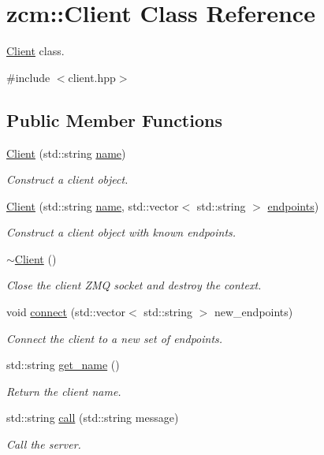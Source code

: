 \hypertarget{classzcm_1_1Client}{}\section{zcm\+:\+:Client Class Reference}
\label{classzcm_1_1Client}


\hyperlink{classzcm_1_1Client}{Client} class.  




{\ttfamily \#include $<$client.\+hpp$>$}

\subsection*{Public Member Functions}
\begin{DoxyCompactItemize}
\item 
\hyperlink{classzcm_1_1Client_a5da343b18178f50c0ab24b852af7f349}{Client} (std\+::string \hyperlink{classzcm_1_1Client_ae972b951134774fd2246d802e2bc6fc0}{name})
\begin{DoxyCompactList}\small\item\em Construct a client object. \end{DoxyCompactList}\item 
\hyperlink{classzcm_1_1Client_a070dd5b851fe5f5c0a679bcb23d085b3}{Client} (std\+::string \hyperlink{classzcm_1_1Client_ae972b951134774fd2246d802e2bc6fc0}{name}, std\+::vector$<$ std\+::string $>$ \hyperlink{classzcm_1_1Client_a01cfee292bb3546a47ec70fff35ff1b6}{endpoints})
\begin{DoxyCompactList}\small\item\em Construct a client object with known endpoints. \end{DoxyCompactList}\item 
\hyperlink{classzcm_1_1Client_a927b35854850369d4d95b3101f3a9baa}{$\sim$\+Client} ()
\begin{DoxyCompactList}\small\item\em Close the client Z\+MQ socket and destroy the context. \end{DoxyCompactList}\item 
void \hyperlink{classzcm_1_1Client_aabf03e1bc961b1e525cff57986b1b5a8}{connect} (std\+::vector$<$ std\+::string $>$ new\+\_\+endpoints)
\begin{DoxyCompactList}\small\item\em Connect the client to a new set of endpoints. \end{DoxyCompactList}\item 
std\+::string \hyperlink{classzcm_1_1Client_ad4178e9b209db19994204b9dad7aa374}{get\+\_\+name} ()
\begin{DoxyCompactList}\small\item\em Return the client name. \end{DoxyCompactList}\item 
std\+::string \hyperlink{classzcm_1_1Client_a9f62555765181c2feee4631a4b50786d}{call} (std\+::string message)
\begin{DoxyCompactList}\small\item\em Call the server. \end{DoxyCompactList}\end{DoxyCompactItemize}

